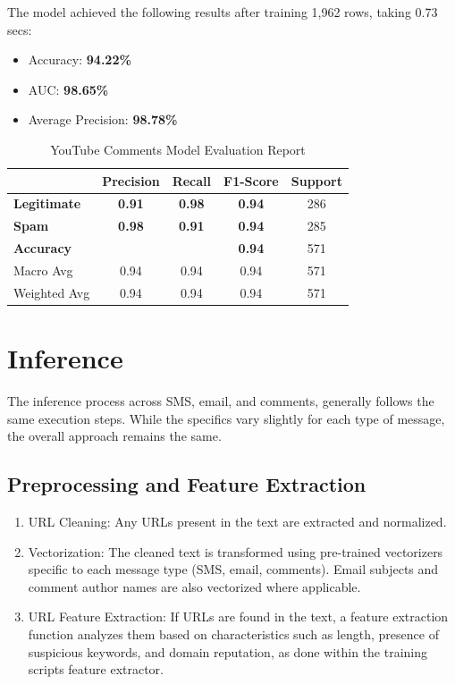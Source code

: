 \documentclass{article}
\begin{document}
\newpage

\noindent
The model achieved the following results after training 1,962 rows, taking 0.73 secs:

\begin{itemize}
    \item Accuracy: \textbf{94.22\%}
    \item AUC: \textbf{98.65\%}
    \item Average Precision: \textbf{98.78\%}
\end{itemize}

\begin{table}[htbp]
    \centering
    \caption{YouTube Comments Model Evaluation Report}
    \begin{tabular}{l c c c c}
    \toprule
     & \textbf{Precision} & \textbf{Recall} & \textbf{F1-Score} & Support \\
    \midrule
    \textbf{Legitimate} & \textbf{0.91} & \textbf{0.98} & \textbf{0.94} & 286 \\
    \textbf{Spam} & \textbf{0.98} & \textbf{0.91} & \textbf{0.94} & 285 \\
    \midrule
    \textbf{Accuracy}  & & & \textbf{0.94} & 571 \\
    Macro Avg & 0.94 & 0.94 & 0.94 & 571 \\
    Weighted Avg & 0.94 & 0.94 & 0.94 & 571 \\
    \bottomrule
    \end{tabular}
    \label{tab:gbm_evaluation}
\end{table}


\section{Inference}

The inference process across SMS, email, and comments, generally follows the same execution steps. While the specifics vary slightly for each type of message, the overall approach remains the same.


\subsection{Preprocessing and Feature Extraction}

\begin{enumerate}
    \item URL Cleaning: Any URLs present in the text are extracted and normalized.
    \item Vectorization: The cleaned text is transformed using pre-trained vectorizers specific to each message type (SMS, email, comments). Email subjects and comment author names are also vectorized where applicable.
    \item URL Feature Extraction: If URLs are found in the text, a feature extraction function analyzes them based on characteristics such as length, presence of suspicious keywords, and domain reputation, as done within the training scripts feature extractor.
\end{enumerate}
\end{document}

